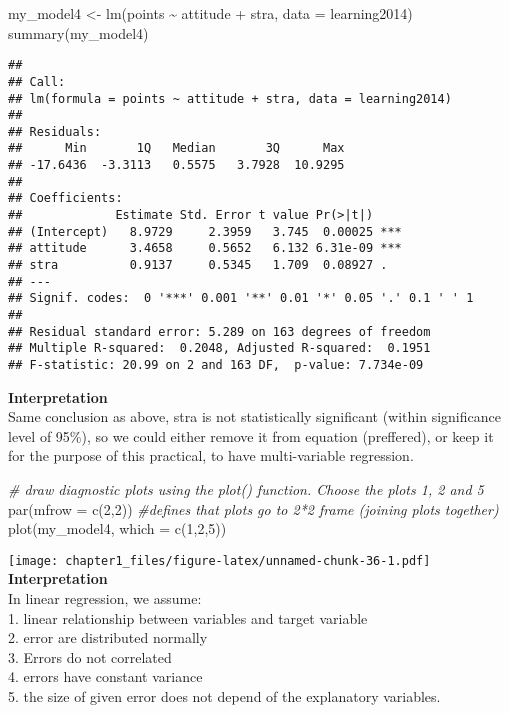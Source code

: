 \documentclass[
]{article}
\newenvironment{Shaded}{\begin{snugshade}}{\end{snugshade}}
\newcommand{\AttributeTok}[1]{\textcolor[rgb]{0.77,0.63,0.00}{#1}}
\newcommand{\CommentTok}[1]{\textcolor[rgb]{0.56,0.35,0.01}{\textit{#1}}}
\newcommand{\DecValTok}[1]{\textcolor[rgb]{0.00,0.00,0.81}{#1}}
\newcommand{\FunctionTok}[1]{\textcolor[rgb]{0.00,0.00,0.00}{#1}}
\newcommand{\NormalTok}[1]{#1}
\newcommand{\OtherTok}[1]{\textcolor[rgb]{0.56,0.35,0.01}{#1}}
\newcommand{\SpecialCharTok}[1]{\textcolor[rgb]{0.00,0.00,0.00}{#1}}
\begin{document}
\begin{Shaded}
\begin{Highlighting}[]
\NormalTok{my\_model4 }\OtherTok{\textless{}{-}} \FunctionTok{lm}\NormalTok{(points }\SpecialCharTok{\textasciitilde{}}\NormalTok{ attitude }\SpecialCharTok{+}\NormalTok{ stra, }\AttributeTok{data =}\NormalTok{ learning2014)}
\FunctionTok{summary}\NormalTok{(my\_model4)}
\end{Highlighting}
\end{Shaded}

\begin{verbatim}
## 
## Call:
## lm(formula = points ~ attitude + stra, data = learning2014)
## 
## Residuals:
##      Min       1Q   Median       3Q      Max 
## -17.6436  -3.3113   0.5575   3.7928  10.9295 
## 
## Coefficients:
##             Estimate Std. Error t value Pr(>|t|)    
## (Intercept)   8.9729     2.3959   3.745  0.00025 ***
## attitude      3.4658     0.5652   6.132 6.31e-09 ***
## stra          0.9137     0.5345   1.709  0.08927 .  
## ---
## Signif. codes:  0 '***' 0.001 '**' 0.01 '*' 0.05 '.' 0.1 ' ' 1
## 
## Residual standard error: 5.289 on 163 degrees of freedom
## Multiple R-squared:  0.2048, Adjusted R-squared:  0.1951 
## F-statistic: 20.99 on 2 and 163 DF,  p-value: 7.734e-09
\end{verbatim}

\textbf{Interpretation}\\
Same conclusion as above, stra is not statistically significant (within
significance level of 95\%), so we could either remove it from equation
(preffered), or keep it for the purpose of this practical, to have
multi-variable regression.

\begin{Shaded}
\begin{Highlighting}[]
\CommentTok{\# draw diagnostic plots using the plot() function. Choose the plots 1, 2 and 5}
\FunctionTok{par}\NormalTok{(}\AttributeTok{mfrow =} \FunctionTok{c}\NormalTok{(}\DecValTok{2}\NormalTok{,}\DecValTok{2}\NormalTok{)) }\CommentTok{\#defines that plots go to 2*2 frame (joining plots together)}
\FunctionTok{plot}\NormalTok{(my\_model4, }\AttributeTok{which =} \FunctionTok{c}\NormalTok{(}\DecValTok{1}\NormalTok{,}\DecValTok{2}\NormalTok{,}\DecValTok{5}\NormalTok{))}
\end{Highlighting}
\end{Shaded}

\texttt{[image: chapter1\_files/figure-latex/unnamed-chunk-36-1.pdf]}
\textbf{Interpretation}\\
In linear regression, we assume:\\
1. linear relationship between variables and target variable\\
2. error are distributed normally\\
3. Errors do not correlated\\
4. errors have constant variance\\
5. the size of given error does not depend of the explanatory variables.
\end{document}
